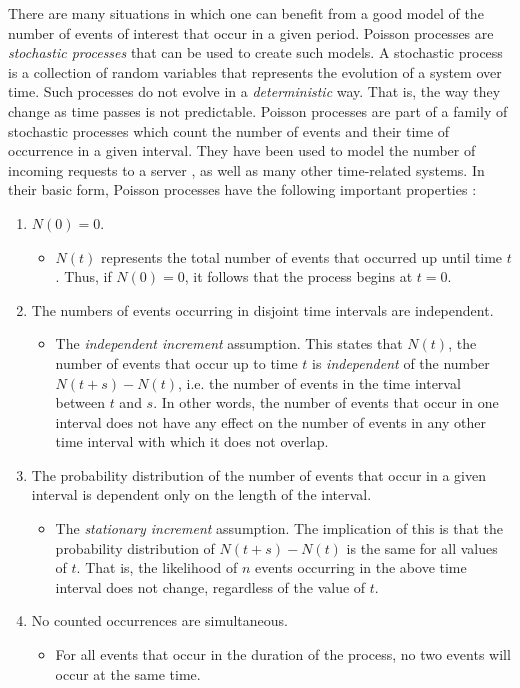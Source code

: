 \documentclass[a4paper,11pt]{article}
\begin{document}
   There are many situations in which one can benefit from a good model of the
   number of events of interest that occur in a given period. Poisson processes
   are \emph{stochastic processes} that can be used to create such models. A
   stochastic process is a collection of random variables that represents the
   evolution of a system over time. Such processes do not evolve in a
   \emph{deterministic} way. That is, the way they change as time passes is not
   predictable. Poisson processes are part of a family of stochastic processes
   which count the number of events and their time of occurrence in a given
   interval. They have been used to model the number of incoming requests to a
   server \cite{arlitt1997internet}, as well as many other time-related
   systems. In their basic form, Poisson processes have the following important
   properties \cite{ross1997simulation}:
\begin{enumerate}
\item $N(0)=0$.
\begin{itemize}
\item $N(t)$ represents the total number of events that occurred up until time
     $t$. Thus, if $N(0)=0$, it follows that the process begins at $t=0$.
\end{itemize}
\item The numbers of events occurring in disjoint time intervals are independent.
\begin{itemize}
\item The \emph{independent increment} assumption. This states that $N(t)$, the
     number of events that occur up to time $t$ is \emph{independent} of the
     number $N(t+s)-N(t)$, i.e. the number of events in the time interval
     between $t$ and $s$. In other words, the number of events that occur in one
     interval does not have any effect on the number of events in any other time
     interval with which it does not overlap.
\end{itemize}
\item The probability distribution of the number of events that occur in a given
   interval is dependent only on the length of the interval.
\begin{itemize}
\item The \emph{stationary increment} assumption. The implication of this is that
     the probability distribution of $N(t+s)-N(t)$ is the same for all values of
     $t$. That is, the likelihood of $n$ events occurring in the above time
     interval does not change, regardless of the value of $t$.
\end{itemize}
\item No counted occurrences are simultaneous.
\begin{itemize}
\item For all events that occur in the duration of the process, no two events
     will occur at the same time.
\end{itemize}
\end{enumerate}
\end{document}
